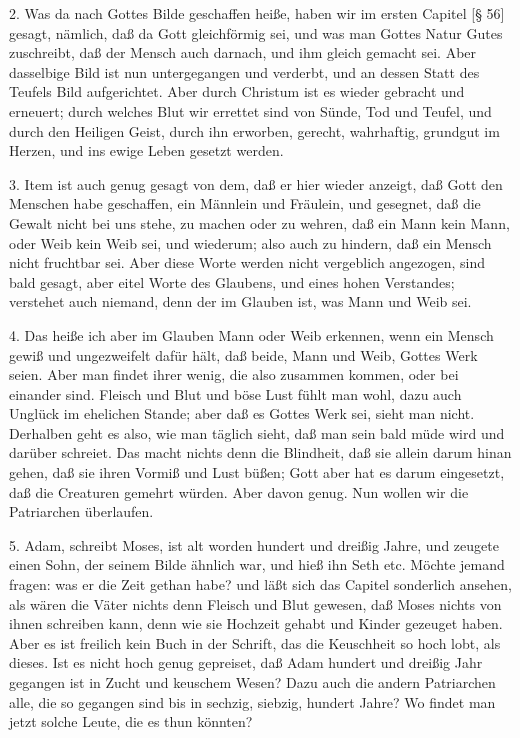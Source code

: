 2. Was da nach Gottes Bilde geschaffen heiße, haben wir im ersten Capitel [§ 56] gesagt, nämlich, daß da Gott gleichförmig sei, und was man Gottes Natur Gutes zuschreibt,
daß der Mensch auch darnach, und ihm gleich gemacht sei. Aber dasselbige Bild ist nun untergegangen und verderbt, und an dessen Statt des Teufels Bild aufgerichtet. Aber durch Christum ist es wieder gebracht und erneuert; durch welches Blut wir errettet sind von Sünde, Tod und Teufel, und durch den Heiligen Geist, durch ihn erworben, gerecht, wahrhaftig, grundgut im Herzen, und ins ewige Leben gesetzt werden.

3. Item ist auch genug gesagt von dem, daß er hier wieder anzeigt, daß Gott den Menschen habe geschaffen, ein Männlein und Fräulein, und gesegnet, daß die Gewalt nicht bei uns stehe, zu machen oder zu wehren, daß ein Mann kein Mann, oder Weib kein Weib sei, und wiederum; also auch zu hindern, daß ein Mensch nicht fruchtbar sei. Aber diese Worte werden nicht vergeblich angezogen, sind bald gesagt, aber eitel Worte des Glaubens, und eines hohen Verstandes; verstehet auch niemand, denn der im Glauben ist, was Mann und Weib sei.

4. Das heiße ich aber im Glauben Mann oder Weib erkennen, wenn ein Mensch gewiß und ungezweifelt dafür hält, daß beide, Mann und Weib, Gottes Werk seien. Aber man findet ihrer wenig, die also zusammen kommen, oder bei einander sind. Fleisch und Blut und böse Lust fühlt man wohl, dazu auch Unglück im ehelichen Stande; aber daß es Gottes Werk sei, sieht man nicht. Derhalben geht es also, wie man täglich sieht, daß man sein bald müde wird und darüber schreiet. Das macht nichts denn die Blindheit, daß sie allein darum hinan gehen, daß sie ihren Vormiß und Lust büßen; Gott aber hat es darum eingesetzt, daß die Creaturen gemehrt würden. Aber davon genug. Nun wollen wir die Patriarchen überlaufen.

5. Adam, schreibt Moses, ist alt worden hundert und dreißig Jahre, und zeugete einen Sohn, der seinem Bilde ähnlich war, und hieß ihn Seth etc. Möchte jemand fragen: was er die Zeit gethan habe? und läßt sich das Capitel sonderlich ansehen, als wären die Väter nichts denn Fleisch und Blut gewesen, daß Moses nichts von ihnen schreiben kann, denn wie sie Hochzeit gehabt und Kinder gezeuget haben. Aber es ist freilich kein Buch in der Schrift, das die Keuschheit so hoch lobt, als dieses. Ist es nicht hoch genug gepreiset, daß Adam hundert und dreißig Jahr gegangen ist in Zucht und keuschem Wesen? Dazu auch die andern Patriarchen alle, die so gegangen sind bis in sechzig, siebzig, hundert Jahre? Wo findet man jetzt solche Leute, die es thun könnten?

